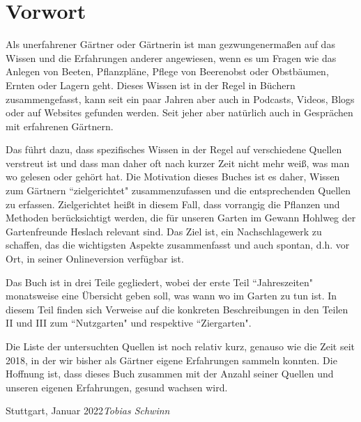 \chapter{Vorwort}

Als unerfahrener Gärtner oder Gärtnerin ist man gezwungenermaßen auf das Wissen und die Erfahrungen anderer angewiesen, wenn es um Fragen wie das Anlegen von Beeten, Pflanzpläne, Pflege von Beerenobst oder Obstbäumen, Ernten oder Lagern geht.
Dieses Wissen ist in der Regel in Büchern zusammengefasst, kann seit ein paar Jahren aber auch in Podcasts, Videos, Blogs oder auf Websites gefunden werden.
Seit jeher aber natürlich auch in Gesprächen mit erfahrenen Gärtnern.

Das führt dazu, dass spezifisches Wissen in der Regel auf verschiedene Quellen verstreut ist und dass man daher oft nach kurzer Zeit nicht mehr weiß, was man wo gelesen oder gehört hat.
Die Motivation dieses Buches ist es daher, Wissen zum Gärtnern ``zielgerichtet" zusammenzufassen und die entsprechenden Quellen zu erfassen.
Zielgerichtet heißt in diesem Fall, dass vorrangig die Pflanzen und Methoden berücksichtigt werden, die für unseren Garten im Gewann Hohlweg der Gartenfreunde Heslach relevant sind.
Das Ziel ist, ein Nachschlagewerk zu schaffen, das die wichtigsten Aspekte zusammenfasst und auch spontan, d.h. vor Ort, in seiner Onlineversion verfügbar ist.

Das Buch ist in drei Teile gegliedert, wobei der erste Teil ``Jahreszeiten" monatsweise eine Übersicht geben soll, was wann wo im Garten zu tun ist.
In diesem Teil finden sich Verweise auf die konkreten Beschreibungen in den Teilen II und III zum ``Nutzgarten" und respektive ``Ziergarten".

Die Liste der untersuchten Quellen ist noch relativ kurz, genauso wie die Zeit seit 2018, in der wir bisher als Gärtner eigene Erfahrungen sammeln konnten.
Die Hoffnung ist, dass dieses Buch zusammen mit der Anzahl seiner Quellen und unseren eigenen Erfahrungen, gesund wachsen wird.

\vspace{\baselineskip}
\begin{flushright}\noindent
	Stuttgart, Januar 2022\hfill {\it Tobias Schwinn}\\
\end{flushright}
